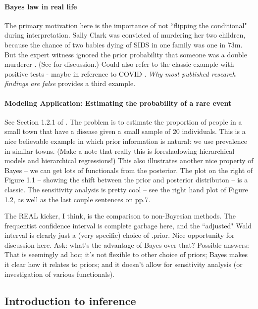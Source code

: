 \documentclass{article} %
\begin{document}
\paragraph{Bayes law in real life}
The primary motivation here is the importance of not ``flipping the conditional" during interpretation.   Sally Clark was convicted of murdering her two children,  because the chance of two babies dying of SIDS in one family was one in 73m.   But the expert witness ignored the prior probability that someone was a double murderer \cite{guardianXXXXobscure}.  (See \cite{hill2004multiple} for discussion.)      Could also refer to the classic example with positive tests - maybe in reference to COVID \cite{guardianXXXXobscure}.     \textit{Why most published research findings are false} \cite{ioannidis2005most} provides a third example. 

\paragraph{Modeling Application: Estimating the probability of a rare event}
See Section 1.2.1 of \cite{hoff2009first}.  The problem is to estimate the proportion of people in a small town that have a disease given a small sample of 20 individuals.     This is a nice believable example in which prior information is natural: we use prevalence in similar towns.  (Make a note that really this is foreshadowing hierarchical models and hierarchical regressions!)  This also illustrates another nice property of Bayes  -- we can get lots of functionals from the posterior.  The plot on the right of Figure 1.1 -- showing the shift between the prior and posterior distributon -- is a classic.   The sensitivity analysis is pretty cool -- see the right hand plot of Figure 1.2,  as well as the last couple sentences on pp.7.    

The REAL kicker,  I think,  is the comparison to non-Bayesian methods.  The frequentist confidence interval is complete garbage here,  and the ``adjusted" Wald interval is clearly just a (very specific) choice of .prior.   Nice opportunity for discussion here.  Ask:  what's the advantage of Bayes over that?  Possible answers: That is seemingly ad hoc; it's not flexible to other choice of priors; Bayes makes it clear how it relates to priors; and it doesn't allow for sensitivity analysis (or investigation of various functionals).  



\subsection{Introduction to inference}
\end{document}
